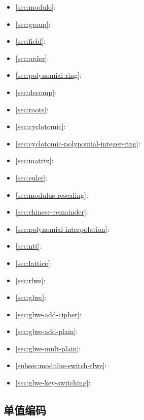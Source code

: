 \begin{tcolorbox}
\begin{itemize}
\item \autoref{sec:modulo}: 
\item \autoref{sec:group}: 
\item \autoref{sec:field}: 
\item \autoref{sec:order}: 
\item \autoref{sec:polynomial-ring}: 
\item \autoref{sec:decomp}: 
\item \autoref{sec:roots}: 
\item \autoref{sec:cyclotomic}: 
\item \autoref{sec:cyclotomic-polynomial-integer-ring}: 
\item \autoref{sec:matrix}: 
\item \autoref{sec:euler}: 
\item \autoref{sec:modulus-rescaling}: 
\item \autoref{sec:chinese-remainder}: 
\item \autoref{sec:polynomial-interpolation}: 
\item \autoref{sec:ntt}: 
\item \autoref{sec:lattice}: 
\item \autoref{sec:rlwe}: 
\item \autoref{sec:glwe}: 
\item \autoref{sec:glwe-add-cipher}: 
\item \autoref{sec:glwe-add-plain}: 
\item \autoref{sec:glwe-mult-plain}: 
\item \autoref{subsec:modulus-switch-rlwe}: 
\item \autoref{sec:glwe-key-switching}: 
\end{itemize}
\end{tcolorbox}

\clearpage

\subsection{单值编码}
\label{subsec:bfv-single-encoding}

